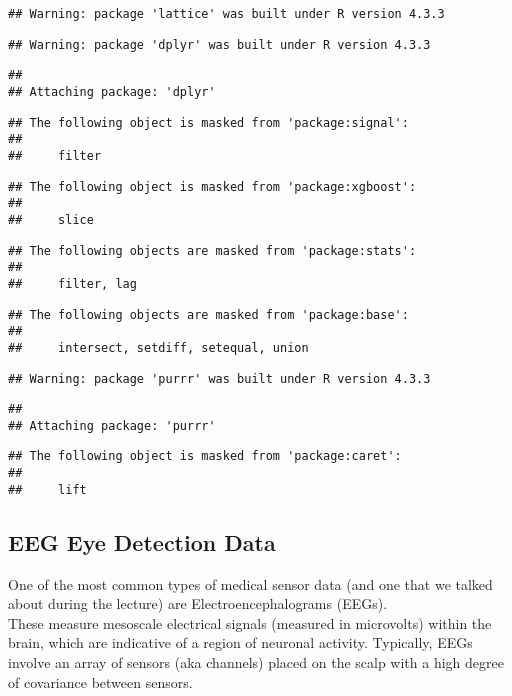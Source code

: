 \documentclass[
]{article}
\begin{document}
\begin{verbatim}
## Warning: package 'lattice' was built under R version 4.3.3
\end{verbatim}

\begin{verbatim}
## Warning: package 'dplyr' was built under R version 4.3.3
\end{verbatim}

\begin{verbatim}
## 
## Attaching package: 'dplyr'
\end{verbatim}

\begin{verbatim}
## The following object is masked from 'package:signal':
## 
##     filter
\end{verbatim}

\begin{verbatim}
## The following object is masked from 'package:xgboost':
## 
##     slice
\end{verbatim}

\begin{verbatim}
## The following objects are masked from 'package:stats':
## 
##     filter, lag
\end{verbatim}

\begin{verbatim}
## The following objects are masked from 'package:base':
## 
##     intersect, setdiff, setequal, union
\end{verbatim}

\begin{verbatim}
## Warning: package 'purrr' was built under R version 4.3.3
\end{verbatim}

\begin{verbatim}
## 
## Attaching package: 'purrr'
\end{verbatim}

\begin{verbatim}
## The following object is masked from 'package:caret':
## 
##     lift
\end{verbatim}

\subsection{EEG Eye Detection Data}\label{eeg-eye-detection-data}

One of the most common types of medical sensor data (and one that we
talked about during the lecture) are Electroencephalograms (EEGs).\\
These measure mesoscale electrical signals (measured in microvolts)
within the brain, which are indicative of a region of neuronal activity.
Typically, EEGs involve an array of sensors (aka channels) placed on the
scalp with a high degree of covariance between sensors.
\end{document}
